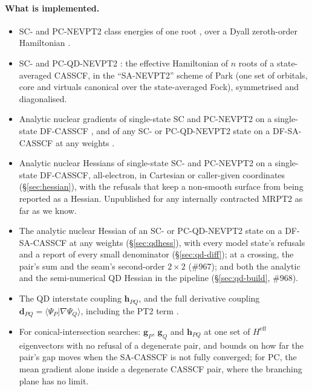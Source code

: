 \documentclass[11pt]{article}
\newcommand{\Heff}{H^{\mathrm{eff}}}
\begin{document}
\paragraph{What is implemented.}
\begin{itemize}
\item SC- and PC-NEVPT2 class energies of one root
  \cite{angeli2001,angeli2001cpl,angeli2002}, over a Dyall zeroth-order
  Hamiltonian \cite{dyall1995}.
\item SC- and PC-QD-NEVPT2 \cite{angeli2004}: the effective Hamiltonian of
  $n$ roots of a state-averaged CASSCF, in the ``SA-NEVPT2'' scheme of
  Park \cite{park2020} (one set of orbitals, core and virtuals canonical
  over the state-averaged Fock), symmetrised and diagonalised.
\item Analytic nuclear gradients of single-state SC and PC-NEVPT2 on a
  single-state DF-CASSCF \cite{park2019,park2019arxiv}, and of any SC- or
  PC-QD-NEVPT2 state on a DF-SA-CASSCF at any weights \cite{park2020}.
\item Analytic nuclear Hessians of single-state SC- and PC-NEVPT2 on a
  single-state DF-CASSCF, all-electron, in Cartesian or caller-given
  coordinates (\S\ref{sec:hessian}), with the refusals that keep a
  non-smooth surface from being reported as a Hessian. Unpublished for any
  internally contracted MRPT2 as far as we know.
\item The analytic nuclear Hessian of an SC- or PC-QD-NEVPT2 state on a
  DF-SA-CASSCF at any weights (\S\ref{sec:qdhess}), with every
  model state's refusals and a report of every small denominator
  (\S\ref{sec:qd-diff}); at a crossing, the pair's sum and the seam's
  second-order $2\times2$ (\#967); and both the analytic and the
  semi-numerical QD Hessian in the pipeline (\S\ref{sec:qd-build}, \#968).
\item The QD interstate coupling $\mathbf h_{PQ}$, and the full derivative
  coupling $\mathbf d_{PQ} = \langle\Psi_P|\nabla\Psi_Q\rangle$, including the
  PT2 term \cite{park2020,park2017}.
\item For conical-intersection searches: $\mathbf g_P$, $\mathbf g_Q$ and
  $\mathbf h_{PQ}$ at one set of $\Heff$ eigenvectors with no refusal of a
  degenerate pair, and bounds on how far the pair's gap moves when the
  SA-CASSCF is not fully converged; for PC, the mean gradient alone inside a
  degenerate CASSCF pair, where the branching plane has no limit.
\end{itemize}
\end{document}

